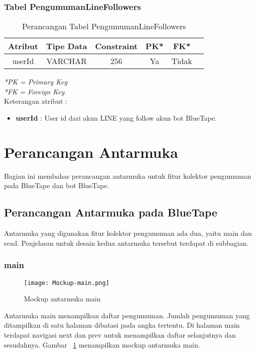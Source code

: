 \subsubsection{Tabel PengumumanLineFollowers}
\begin{center}
	\begin{table}[H]
	\caption{Perancangan Tabel PengumumanLineFollowers}
	\begin{tabular}{|c|c|c|c|c|c|}
 			\hline
			\textbf{Atribut} & \textbf{Tipe Data} & \textbf{Constraint} & \textbf{PK*}  & \textbf{FK*} \\
			\hline
			 userId & VARCHAR & 256 & Ya & Tidak\\
            \hline
	\end{tabular}
	\end{table}
\end{center}
\textit{*PK = Primary Key} \\
\textit{*FK = Foreign Key} \\

Keterangan atribut :
\begin{itemize}
\item \textbf{userId} : User id dari akun LINE yang follow akun bot BlueTape.
\end{itemize}

\section{Perancangan Antarmuka}
	Bagian ini membahas perancangan antarmuka untuk fitur kolektor pengumuman pada BlueTape dan bot BlueTape.
\subsection{Perancangan Antarmuka pada BlueTape}
Antarmuka yang digunakan fitur kolektor pengumuman ada dua, yaitu main dan read. Penjelasan untuk desain kedua antarmuka tersebut terdapat di subbagian.

\subsubsection{main}

\begin{figure}[H]
	\centering  
	\texttt{[image: Mockup-main.png]}  
	\caption[Mockup antarmuka main]{Mockup antarmuka main} 
	\label{fig:mockup-main} 
\end{figure}

Antarmuka main menampilkan daftar pengumuman. Jumlah pengumuman yang ditampilkan di satu halaman dibatasi pada angka tertentu. Di halaman main terdapat navigasi next dan prev untuk menampilkan daftar selanjutnya dan sesudahnya. Gambar~ \ref{fig:mockup-main} menampilkan mockup antarmuka main.

